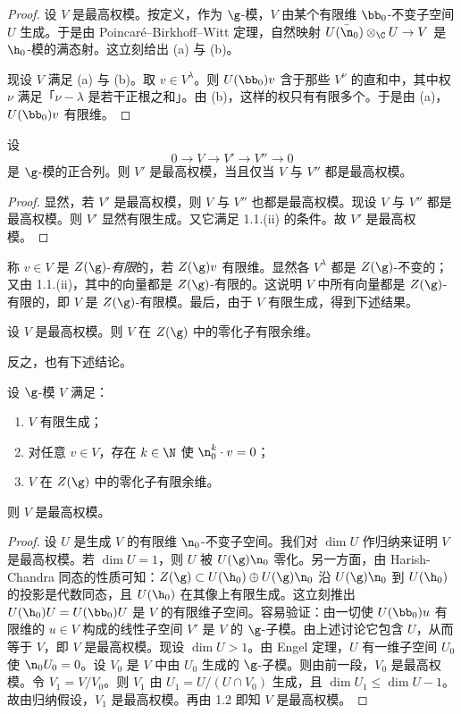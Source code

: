 \begin{proof}
设 $V$ 是最高权模。按定义，作为 $\g$-模，$V$ 由某个有限维 $\bb_0$-不变子空间 $U$ 生成。于是由 Poincaré--Birkhoff--Witt 定理，自然映射 $U(\bar{\n}_0)\otimes_\C U\to V$ 是 $\h_0$-模的满态射。这立刻给出 (a) 与 (b)。

现设 $V$ 满足 (a) 与 (b)。取 $v\in V^\lambda$。则 $U(\bb_0)v$ 含于那些 $V^\nu$ 的直和中，其中权 $\nu$ 满足「$\nu-\lambda$ 是若干正根之和」。由 (b)，这样的权只有有限多个。于是由 (a)，$U(\bb_0)v$ 有限维。
\end{proof}

\begin{lemma}\label{lem:05.1.2}
设
$$0\longrightarrow V\longrightarrow V'\longrightarrow V''\longrightarrow 0$$
是 $\g$-模的正合列。则 $V'$ 是最高权模，当且仅当 $V$ 与 $V''$ 都是最高权模。
\end{lemma}

\begin{proof}
显然，若 $V'$ 是最高权模，则 $V$ 与 $V''$ 也都是最高权模。现设 $V$ 与 $V''$ 都是最高权模。则 $V'$ 显然有限生成。又它满足 1.1.(ii) 的条件。故 $V'$ 是最高权模。
\end{proof}

称 $v\in V$ 是 $Z(\g)$-\emph{有限}的，若 $Z(\g)v$ 有限维。显然各 $V^\lambda$ 都是 $Z(\g)$-不变的；又由 1.1.(ii)，其中的向量都是 $Z(\g)$-有限的。这说明 $V$ 中所有向量都是 $Z(\g)$-有限的，即 $V$ 是 $Z(\g)$-有限模。最后，由于 $V$ 有限生成，得到下述结果。

\begin{lemma}\label{lem:05.1.3}
设 $V$ 是最高权模。则 $V$ 在 $Z(\g)$ 中的零化子有限余维。
\end{lemma}

反之，也有下述结论。

\begin{proposition}\label{prop:05.1.4}
设 $\g$-模 $V$ 满足：
\begin{enumerate}[label=(\roman*)]
\item $V$ 有限生成；
\item 对任意 $v\in V$，存在 $k\in\N$ 使 $\n_0^k\cdot v=0$；
\item $V$ 在 $Z(\g)$ 中的零化子有限余维。
\end{enumerate}
则 $V$ 是最高权模。
\end{proposition}

\begin{proof}
设 $U$ 是生成 $V$ 的有限维 $\n_0$-不变子空间。我们对 $\dim U$ 作归纳来证明 $V$ 是最高权模。若 $\dim U=1$，则 $U$ 被 $U(\g)\n_0$ 零化。另一方面，由 Harish-Chandra 同态的性质可知：$Z(\g)\subset U(\h_0)\oplus U(\g)\n_0$ 沿 $U(\g)\n_0$ 到 $U(\h_0)$ 的投影是代数同态，且 $U(\h_0)$ 在其像上有限生成。这立刻推出 $U(\h_0)U=U(\bb_0)U$ 是 $V$ 的有限维子空间。容易验证：由一切使 $U(\bb_0)u$ 有限维的 $u\in V$ 构成的线性子空间 $V'$ 是 $V$ 的 $\g$-子模。由上述讨论它包含 $U$，从而等于 $V$，即 $V$ 是最高权模。现设 $\dim U>1$。由 Engel 定理，$U$ 有一维子空间 $U_0$ 使 $\n_0U_0=0$。设 $V_0$ 是 $V$ 中由 $U_0$ 生成的 $\g$-子模。则由前一段，$V_0$ 是最高权模。令 $V_1=V/V_0$。则 $V_1$ 由 $U_1=U/(U\cap V_0)$ 生成，且 $\dim U_1\le\dim U-1$。故由归纳假设，$V_1$ 是最高权模。再由 1.2 即知 $V$ 是最高权模。
\end{proof}

